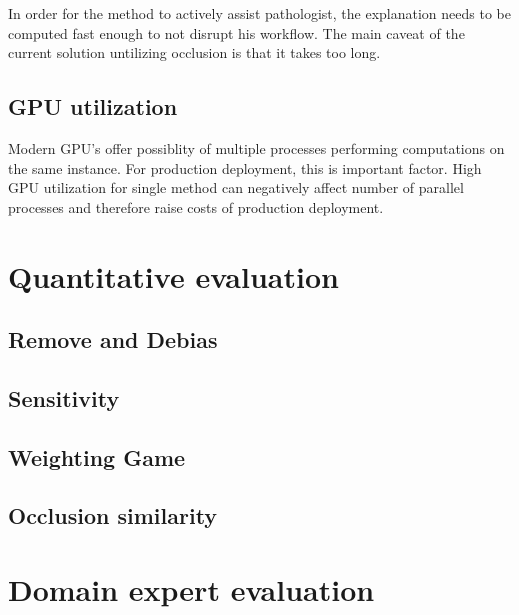 In order for the method to actively assist pathologist, the explanation needs to be computed fast enough to not disrupt his workflow. The main caveat of the current solution untilizing occlusion is that it takes too long.

\subsection{GPU utilization}

Modern GPU's offer possiblity of multiple processes performing computations on the same instance. For production deployment, this is important factor. High GPU utilization for single method can negatively affect number of parallel processes and therefore raise costs of production deployment.

\section{Quantitative evaluation}

\subsection{Remove and Debias}

\subsection{Sensitivity}

\subsection{Weighting Game}

\subsection{Occlusion similarity}

\section{Domain expert evaluation}
